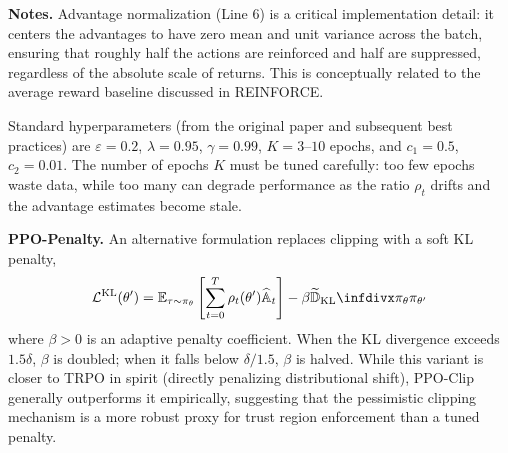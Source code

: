 \documentclass[11pt, letterpaper]{article}
\begin{document}
\begin{remark}
    \textbf{Notes.} Advantage normalization (Line 6) is a critical implementation detail: it centers the advantages to have zero mean and unit variance across the batch, ensuring that roughly half the actions are reinforced and half are suppressed, regardless of the absolute scale of returns. This is conceptually related to the average reward baseline discussed in REINFORCE. 

    Standard hyperparameters (from the original paper and subsequent best practices) are \(\varepsilon = 0.2\), \(\lambda = 0.95\), \(\gamma = 0.99\), \(K = 3\text{--}10\) epochs, and \(c_1 = 0.5\), \(c_2 = 0.01\). The number of epochs \(K\) must be tuned carefully: too few epochs waste data, while too many can degrade performance as the ratio \(\rho_t\) drifts and the advantage estimates become stale.

    \textbf{PPO-Penalty.} An alternative formulation replaces clipping with a soft KL penalty, 
    \[
        \mathcal{L}^{\text{KL}}(\theta') = \mathbb{E}_{\tau \sim \pi_\theta}\left[\sum_{t=0}^T \rho_t(\theta') \widehat{\mathbb{A}}_t\right] - \beta \TKL{\pi_\theta}{\pi_{\theta'}}
    \]
    where \(\beta > 0\) is an adaptive penalty coefficient. When the KL divergence exceeds \(1.5\delta\), \(\beta\) is doubled; when it falls below \(\delta / 1.5\), \(\beta\) is halved. While this variant is closer to TRPO in spirit (directly penalizing distributional shift), PPO-Clip generally outperforms it empirically, suggesting that the pessimistic clipping mechanism is a more robust proxy for trust region enforcement than a tuned penalty.
\end{remark}
\end{document}
